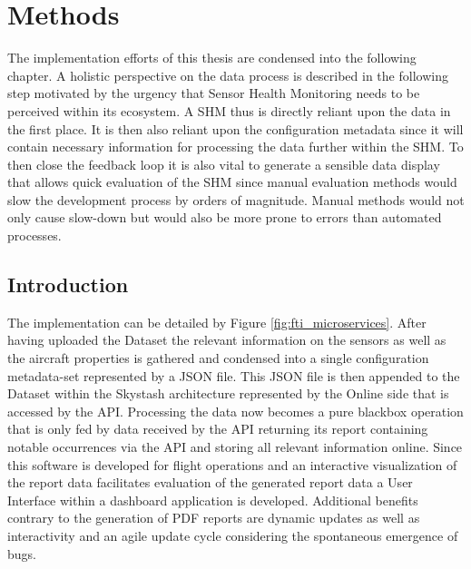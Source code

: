 %

\chapter{Methods}
\label{chap:4-methods}
The implementation efforts of this thesis are condensed into the following chapter. A holistic perspective on the data process is described in the following step motivated by the urgency that Sensor Health Monitoring needs to be perceived within its ecosystem. A SHM thus is directly reliant upon the data in the first place. It is then also reliant upon the configuration metadata since it will contain necessary information for processing the data further within the SHM. To then close the feedback loop it is also vital to generate a sensible data display that allows quick evaluation of the SHM since manual evaluation methods would slow the development process by orders of magnitude. Manual methods would not only cause slow-down but would also be more prone to errors than automated processes.\cite{barchard_preventing_2011}


\section{Introduction}

The implementation can be detailed by Figure \ref{fig:fti_microservices}. After having uploaded the Dataset the relevant information on the sensors as well as the aircraft properties is gathered and condensed into a single configuration metadata-set represented by a JSON file. This JSON file is then appended to the Dataset within the Skystash architecture represented by the Online side that is accessed by the API. Processing the data now becomes a pure blackbox operation that is only fed by data received by the API returning its report containing notable occurrences via the API and storing all relevant information online. Since this software is developed for flight operations and an interactive visualization of the report data facilitates evaluation of the generated report data a User Interface within a dashboard application is developed. Additional benefits contrary to the generation of PDF reports are dynamic updates as well as interactivity and an agile update cycle considering the spontaneous emergence of bugs.


